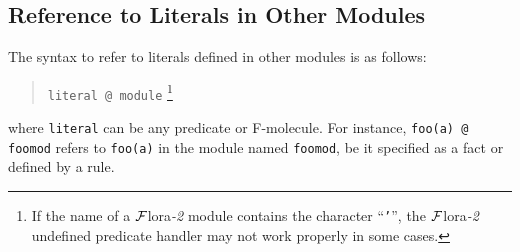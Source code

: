 \documentclass[11pt]{article}
\newcommand{\FLORA}{{\mbox{${\cal F}${\sc lora}\rm\emph{-2}}}\xspace}
\begin{document}
\subsection{Reference to Literals in Other Modules}


%
The syntax to refer to literals defined in other modules is as follows:
\begin{quote}
\verb|literal @ module| \footnote{
%
If the name of a \FLORA module contains the character ``{\tt '}'', the
\FLORA undefined predicate handler may not work properly in some cases.
%
}
\end{quote}
where {\tt literal} can be any predicate or F-molecule. For instance,
\verb|foo(a) @ foomod| refers to {\tt foo(a)} in the module named
{\tt foomod}, be it specified as a fact or defined by a rule.
\end{document}
